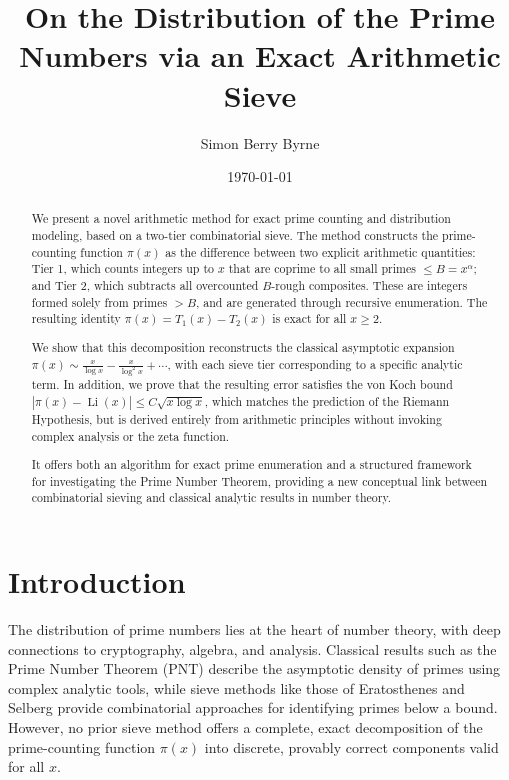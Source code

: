 \documentclass[11pt]{article}
\title{On the Distribution of the Prime Numbers via an Exact Arithmetic Sieve}
\author{Simon Berry Byrne}
\date{\today}
\begin{document}
	
	\maketitle
		
		
	\begin{abstract}
		We present a novel arithmetic method for exact prime counting and distribution modeling, based on a two-tier combinatorial sieve. The method constructs the prime-counting function \( \pi(x) \) as the difference between two explicit arithmetic quantities: Tier 1, which counts integers up to \( x \) that are coprime to all small primes \( \leq B = x^\alpha \); and Tier 2, which subtracts all overcounted \( B \)-rough composites. These are integers formed solely from primes \( > B \), and are generated through recursive enumeration. The resulting identity \( \pi(x) = T_1(x) - T_2(x) \) is exact for all \( x \ge 2 \).
		
		We show that this decomposition reconstructs the classical asymptotic expansion \( \pi(x) \sim \frac{x}{\log x} - \frac{x}{\log^2 x} + \cdots \), with each sieve tier corresponding to a specific analytic term. In addition, we prove that the resulting error satisfies the von Koch bound \( |\pi(x) - \operatorname{Li}(x)| \le C \sqrt{x \log x} \), which matches the prediction of the Riemann Hypothesis, but is derived entirely from arithmetic principles without invoking complex analysis or the zeta function.
		
		It offers both an algorithm for exact prime enumeration and a structured framework for investigating the Prime Number Theorem, providing a new conceptual link between combinatorial sieving and classical analytic results in number theory.
	\end{abstract}



	
	\section{Introduction}
	
	The distribution of prime numbers lies at the heart of number theory, with deep connections to cryptography, algebra, and analysis. Classical results such as the Prime Number Theorem (PNT) describe the asymptotic density of primes using complex analytic tools, while sieve methods like those of Eratosthenes and Selberg provide combinatorial approaches for identifying primes below a bound. However, no prior sieve method offers a complete, exact decomposition of the prime-counting function $\pi(x)$ into discrete, provably correct components valid for all $x$.
	
\end{document}
